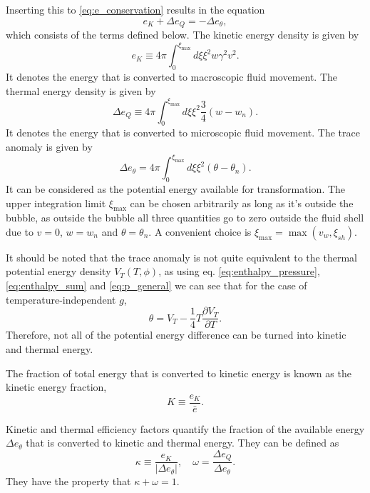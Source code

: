 Inserting this to \eqref{eq:e_conservation} results in the equation
\begin{equation}
e_K + \Delta e_Q = - \Delta e_\theta,
\end{equation}
which consists of the terms defined below.
The kinetic energy density is given by
\begin{equation}
e_K \equiv 4 \pi \int_0^{\xi_\text{max}} d\xi \xi^2 w \gamma^2 v^2.
\end{equation}
It denotes the energy that is converted to macroscopic fluid movement.
The thermal energy density is given by
\begin{equation}
\Delta e_Q \equiv 4 \pi \int_0^{\xi_\text{max}} d\xi \xi^2 \frac{3}{4} (w - w_n).
\end{equation}
It denotes the energy that is converted to microscopic fluid movement.
The trace anomaly is given by
\begin{equation}
\Delta e_\theta = 4 \pi \int_0^{\xi_\text{max}} d\xi \xi^2 (\theta - \theta_n).
\end{equation}
It can be considered as the potential energy available for transformation.
The upper integration limit $\xi_\text{max}$ can be chosen arbitrarily as long as it's outside the bubble, as outside the bubble all three quantities go to zero outside the fluid shell due to $v=0$, $w=w_n$ and $\theta = \theta_n$.
A convenient choice is $\xi_\text{max} = \max (v_w, \xi_{sh})$.

It should be noted that the trace anomaly is not quite equivalent to the thermal potential energy density $V_T(T,\phi)$, as using eq. \eqref{eq:enthalpy_pressure}, \eqref{eq:enthalpy_sum} and \eqref{eq:p_general} we can see that for the case of temperature-independent $g$,
\begin{equation}
\theta = V_T - \frac{1}{4} T \frac{\partial V_T}{\partial T}.
\end{equation}
Therefore, not all of the potential energy difference can be turned into kinetic and thermal energy.
\cite[ch. B.2]{hindmarsh_gw_pt_2019}

The fraction of total energy that is converted to kinetic energy is known as the kinetic energy fraction,
\begin{equation}
K \equiv \frac{e_K}{\bar{e}}.
\end{equation}

Kinetic and thermal efficiency factors quantify the fraction of the available energy $\Delta e_\theta$ that is converted to kinetic and thermal energy.
They can be defined as
\begin{equation}
\kappa \equiv \frac{e_K}{| \Delta e_\theta |}, \quad
\omega = \frac{\Delta e_Q}{\Delta e_\theta}.
\end{equation}
They have the property that $\kappa + \omega = 1$.

